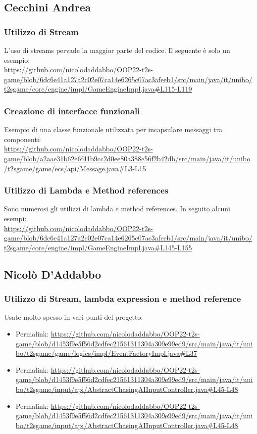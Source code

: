 \documentclass[a4paper,12pt]{report}
\begin{document}
\subsection*{Cecchini Andrea}
\subsubsection*{Utilizzo di Stream}
L'uso di streams pervade la maggior parte del codice.
Il seguente è solo un esempio: 
\\
\url{https://github.com/nicolodaddabbo/OOP22-t2s-game/blob/6dc6e41a127a2c02e07ca14e6265c07ac3afeeb1/src/main/java/it/unibo/t2sgame/core/engine/impl/GameEngineImpl.java#L115-L119}

\subsubsection*{Creazione di interfacce funzionali}
Esempio di una classe funzionale utilizzata per incapsulare messaggi tra componenti:
\\
\url{https://github.com/nicolodaddabbo/OOP22-t2s-game/blob/a2aae31b62e6f41b9cc2d0ee80a388e56f2b42db/src/main/java/it/unibo/t2sgame/game/ecs/api/Message.java#L3-L15}
\subsubsection*{Utilizzo di Lambda e Method references}
Sono numerosi gli utilizzi di lambda e method references. In seguito alcuni esempi: 
\\
\url{https://github.com/nicolodaddabbo/OOP22-t2s-game/blob/6dc6e41a127a2c02e07ca14e6265c07ac3afeeb1/src/main/java/it/unibo/t2sgame/core/engine/impl/GameEngineImpl.java#L145-L155}


\subsection*{Nicolò D'Addabbo}
\subsubsection*{Utilizzo di Stream, lambda expression e method reference}
Usate molto spesso in vari punti del progetto:
\begin{itemize}
	\item Permalink: \url{https://github.com/nicolodaddabbo/OOP22-t2s-game/blob/d1453f9e5f56d2cdfec21561311304a309e99ed9/src/main/java/it/unibo/t2sgame/game/logics/impl/EventFactoryImpl.java#L37}
	\item Permalink: \url{https://github.com/nicolodaddabbo/OOP22-t2s-game/blob/d1453f9e5f56d2cdfec21561311304a309e99ed9/src/main/java/it/unibo/t2sgame/input/api/AbstractChasingAIInputController.java#L45-L48}
	\item Permalink: \url{https://github.com/nicolodaddabbo/OOP22-t2s-game/blob/d1453f9e5f56d2cdfec21561311304a309e99ed9/src/main/java/it/unibo/t2sgame/input/api/AbstractChasingAIInputController.java#L45-L48}
\end{itemize}
\end{document}
